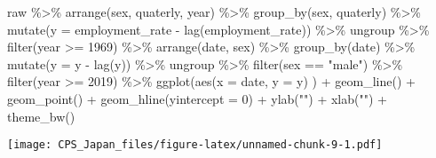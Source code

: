\documentclass[
]{book}
\newenvironment{Shaded}{\begin{snugshade}}{\end{snugshade}}
\newcommand{\AttributeTok}[1]{\textcolor[rgb]{0.77,0.63,0.00}{#1}}
\newcommand{\DecValTok}[1]{\textcolor[rgb]{0.00,0.00,0.81}{#1}}
\newcommand{\FunctionTok}[1]{\textcolor[rgb]{0.00,0.00,0.00}{#1}}
\newcommand{\NormalTok}[1]{#1}
\newcommand{\SpecialCharTok}[1]{\textcolor[rgb]{0.00,0.00,0.00}{#1}}
\newcommand{\StringTok}[1]{\textcolor[rgb]{0.31,0.60,0.02}{#1}}
\begin{document}
\begin{Shaded}
\begin{Highlighting}[]
\NormalTok{raw }\SpecialCharTok{\%\textgreater{}\%}
  \FunctionTok{arrange}\NormalTok{(sex,}
\NormalTok{          quaterly,}
\NormalTok{          year) }\SpecialCharTok{\%\textgreater{}\%}
  \FunctionTok{group\_by}\NormalTok{(sex,}
\NormalTok{           quaterly) }\SpecialCharTok{\%\textgreater{}\%}
  \FunctionTok{mutate}\NormalTok{(}\AttributeTok{y =}\NormalTok{ employment\_rate }\SpecialCharTok{{-}} \FunctionTok{lag}\NormalTok{(employment\_rate)) }\SpecialCharTok{\%\textgreater{}\%}
\NormalTok{  ungroup }\SpecialCharTok{\%\textgreater{}\%}
  \FunctionTok{filter}\NormalTok{(year }\SpecialCharTok{\textgreater{}=} \DecValTok{1969}\NormalTok{) }\SpecialCharTok{\%\textgreater{}\%}
  \FunctionTok{arrange}\NormalTok{(date,}
\NormalTok{          sex) }\SpecialCharTok{\%\textgreater{}\%}
  \FunctionTok{group\_by}\NormalTok{(date) }\SpecialCharTok{\%\textgreater{}\%}
  \FunctionTok{mutate}\NormalTok{(}\AttributeTok{y =}\NormalTok{ y }\SpecialCharTok{{-}} \FunctionTok{lag}\NormalTok{(y)) }\SpecialCharTok{\%\textgreater{}\%}
\NormalTok{  ungroup }\SpecialCharTok{\%\textgreater{}\%}
  \FunctionTok{filter}\NormalTok{(sex }\SpecialCharTok{==} \StringTok{"male"}\NormalTok{) }\SpecialCharTok{\%\textgreater{}\%}
  \FunctionTok{filter}\NormalTok{(year }\SpecialCharTok{\textgreater{}=} \DecValTok{2019}\NormalTok{) }\SpecialCharTok{\%\textgreater{}\%}
  \FunctionTok{ggplot}\NormalTok{(}\FunctionTok{aes}\NormalTok{(}\AttributeTok{x =}\NormalTok{ date,}
             \AttributeTok{y =}\NormalTok{ y)}
\NormalTok{         ) }\SpecialCharTok{+}
  \FunctionTok{geom\_line}\NormalTok{() }\SpecialCharTok{+}
  \FunctionTok{geom\_point}\NormalTok{() }\SpecialCharTok{+}
  \FunctionTok{geom\_hline}\NormalTok{(}\AttributeTok{yintercept =} \DecValTok{0}\NormalTok{) }\SpecialCharTok{+}
  \FunctionTok{ylab}\NormalTok{(}\StringTok{""}\NormalTok{) }\SpecialCharTok{+}
  \FunctionTok{xlab}\NormalTok{(}\StringTok{""}\NormalTok{) }\SpecialCharTok{+}
  \FunctionTok{theme\_bw}\NormalTok{()}
\end{Highlighting}
\end{Shaded}

\texttt{[image: CPS\_Japan\_files/figure-latex/unnamed-chunk-9-1.pdf]}

  
\end{document}
